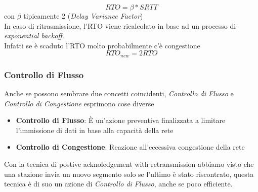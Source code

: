 \documentclass{article}
\newcounter{subsubsubsection}[subsubsection]
\begin{document}
                    \[
                        RTO = \beta*SRTT    
                    \]
                    con $ \beta $ tipicamente 2 (\textit{Delay Variance Factor})\\
                    In caso di ritrasmissione, l'RTO viene ricalcolato in base ad un processo di \textit{exponential backoff}.\\
                    Infatti se è scaduto l'RTO molto probabilmente c'è congestione
                    \[
                        RTO_{new} = 2RTO 
                    \]

            \subsubsection{Controllo di Flusso}
                Anche se possono sembrare due concetti coincidenti, \textit{Controllo di Flusso} e \textit{Controllo di Congestione} esprimono cose diverse
                \begin{itemize}
                    \item \textbf{Controllo di Flusso}: È un'azione preventiva finalizzata a limitare l'immissione di dati in base alla capacità della rete
                    \item \textbf{Controllo di Congestione}: Reazione all'eccessiva congestione della rete
                \end{itemize}
                Con la tecnica di postive acknoledgement with retransmission abbiamo visto che una stazione invia un nuovo segmento solo se l’ultimo è stato riscontrato, questa tecnica è di suo un azione di \textit{Controllo di Flusso}, anche se poco efficiente.
\end{document}
